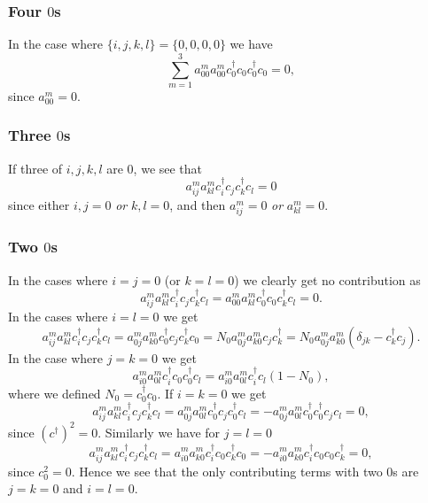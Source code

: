 \documentclass[a4paper,11pt]{article}
\numberwithin{equation}{section}
\begin{document}
\subsubsection*{Four $ 0 $s}
In the case where $ \{i,j,k,l\}=\{0,0,0,0\} $ we have \begin{equation}
\sum_{m=1}^{3}a^m_{00}a^m_{00}c_0^\dagger c_0c_0^\dagger c_0=0,
\end{equation}
since $ a_{00}^m=0 $.
\subsubsection*{Three $ 0 $s}
If three of $ i,j,k,l $ are $ 0 $, we see that \begin{equation}
a^m_{ij}a^m_{kl}c_i^\dagger c_jc_k^\dagger c_l=0
\end{equation}
since either $ i,j=0 $ \emph{or} $ k,l=0 $, and then $ a^m_{ij}=0 $ \emph{or} $ a^m_{kl}=0 $.
\subsubsection*{Two $ 0 $s}
In the cases where $ i=j=0 $ (or $ k=l=0 $) we clearly get no contribution as\begin{equation}
a^m_{ij}a^m_{kl}c_i^\dagger c_jc_k^\dagger c_l=a^m_{00}a^m_{kl}c_0^\dagger c_0c_k^\dagger c_l=0.
\end{equation}
In the cases where $ i=l=0 $ we get \begin{equation}
a^m_{ij}a^m_{kl}c_i^\dagger c_jc_k^\dagger c_l=a^m_{0j}a^m_{k0}c_0^\dagger c_jc_k^\dagger c_0=N_0a^m_{0j}a^m_{k0} c_jc_k^\dagger=N_0a^m_{0j}a^m_{k0}(\delta_{jk}-c^\dagger_kc_j).
\end{equation}
In the case where $ j=k=0 $ we get \begin{equation}
a^m_{i0}a^m_{0l}c_i^\dagger c_0c_0^\dagger c_l=a^m_{i0}a^m_{0l}c_i^\dagger c_l(1-N_0),
\end{equation}
where we defined $ N_0=c_0^\dagger c_0 $.
If $ i=k=0 $ we get \begin{equation}
a^m_{ij}a^m_{kl}c_i^\dagger c_jc_k^\dagger c_l=a^m_{0j}a^m_{0l}c_0^\dagger c_jc_0^\dagger c_l=-a^m_{0j}a^m_{0l}c_0^\dagger c_0^\dagger c_j c_l=0,
\end{equation}
since $ (c^\dagger)^2=0 $. Similarly we have for $ j=l=0 $
\begin{equation}
a^m_{ij}a^m_{kl}c_i^\dagger c_jc_k^\dagger c_l=a^m_{i0}a^m_{k0}c_i^\dagger c_0c_k^\dagger c_0=-a^m_{i0}a^m_{k0}c_i^\dagger c_0c_0c_k^\dagger=0,
\end{equation}
since $ c_0^2=0 $. Hence we see that the only contributing terms with two $ 0 $s are $ j=k=0 $ and $ i=l=0 $.
\end{document}
